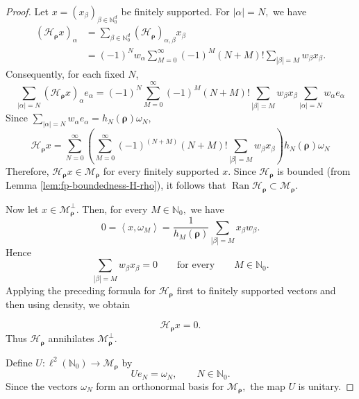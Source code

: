 \documentclass[10pt,a4paper]{amsart}
\begin{document}
\begin{proof}
Let $x=(x_{\beta})_{\beta\in\mathbb{N}_{0}^{d}}$ be finitely supported. For $|\alpha|=N,$ we have
\[
\begin{aligned}
(\mathcal{H}_{\boldsymbol{\rho}}x)_{\alpha}
&=
\sum_{\beta\in\mathbb{N}_{0}^{d}}
(\mathcal{H}_{\boldsymbol{\rho}})_{\alpha,\beta}x_{\beta}  \\
&=
(-1)^Nw_{\alpha}
\sum_{M=0}^{\infty}
(-1)^M(N+M)!
\sum_{|\beta|=M}w_{\beta}x_{\beta}.
\end{aligned}
\]
Consequently, for each fixed \(N\),
\[
\sum_{|\alpha|=N}(\mathcal{H}_{\boldsymbol{\rho}}x)_{\alpha}e_{\alpha}= (-1)^N
\sum_{M=0}^{\infty}
(-1)^M(N+M)!
\sum_{|\beta|=M}w_{\beta}x_{\beta} \sum_{|\alpha|=N}w_{\alpha}e_{\alpha}
\]
Since $\sum_{|\alpha|=N}w_{\alpha}e_{\alpha}
= h_N(\boldsymbol{\rho})\omega_N,$
\[
\mathcal{H}_{\boldsymbol{\rho}}x =  \sum_{N=0}^{\infty}\left (
\sum_{M=0}^{\infty}
(-1)^{(N+M)}(N+M)!
\sum_{|\beta|=M}w_{\beta}x_{\beta} \right  )h_N(\boldsymbol{\rho})\omega_N
\]
Therefore, $\mathcal{H}_{\boldsymbol{\rho}}x\in \mathcal{M}_{\boldsymbol{\rho}}$  for every finitely supported \(x\). Since \(\mathcal{H}_{\boldsymbol{\rho}}\) is bounded (from Lemma \ref{lem:fp-boundedness-H-rho}), it follows that
$\operatorname{Ran}\mathcal{H}_{\boldsymbol{\rho}}
\subset \mathcal{M}_{\boldsymbol{\rho}}.$


Now let $x\in\mathcal{M}_{\boldsymbol{\rho}}^{\perp}.$
Then, for every $M\in\mathbb{N}_{0},$ we have
\[
0
=
\left\langle x,\omega_M\right\rangle
=
\frac{1}{h_M(\boldsymbol{\rho})}
\sum_{|\beta|=M}x_{\beta}w_{\beta}.
\]
Hence
\[
\sum_{|\beta|=M}w_{\beta}x_{\beta}=0
\qquad
\text{for every}
\qquad
M\in\mathbb{N}_{0}.
\]
Applying the preceding formula  for $\mathcal{H}_{\boldsymbol{\rho}}$ first to finitely supported vectors and then using density, we obtain

\[
\mathcal{H}_{\boldsymbol{\rho}}x=0.
\]
Thus $\mathcal{H}_{\boldsymbol{\rho}}$ annihilates
$\mathcal{M}_{\boldsymbol{\rho}}^{\perp}.$

Define $U:\ell^2(\mathbb{N}_{0})\to \mathcal{M}_{\boldsymbol{\rho}}$  by
\[
Ue_N=\omega_N,
\qquad
N\in\mathbb{N}_{0}.
\]
Since the vectors $\omega_N$ form an orthonormal basis for
$\mathcal{M}_{\boldsymbol{\rho}},$ the map \(U\) is unitary.


\end{proof}
\end{document}
